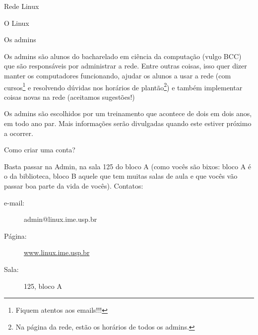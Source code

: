 \begin{subsecao}{Rede Linux}
\begin{subsubsecao}{O Linux}
\end{subsubsecao}

\begin{subsubsecao}{Os admins}

Os admins são alunos do bacharelado em ciência da computação (vulgo BCC) que
são responsáveis por administrar a rede. Entre outras coisas, isso quer dizer
manter os computadores funcionando, ajudar os alunos a usar a rede (com
cursos\footnote{ Fiquem atentos aos emails!!!} e resolvendo dúvidas nos
horários de plantão\footnote{ Na página da rede, estão os horários de todos os
admins.}) e também implementar coisas novas na rede (aceitamos sugestões!)

Os admins são escolhidos por um treinamento que acontece de dois em dois anos,
em todo ano par. Mais informações serão divulgadas quando este estiver próximo
a ocorrer.

\end{subsubsecao}
\begin{subsubsecao}{Como criar uma conta?}

Basta passar na Admin, na sala 125 do bloco A (como vocês são bixos: bloco A é o da
biblioteca, bloco B aquele que tem muitas salas de aula e que vocês vão passar boa
parte da vida de vocês). Contatos:

\vspace{-1em}

\begin{description}
\item [e-mail:] admin@linux.ime.usp.br
\item [Página:] \url{www.linux.ime.usp.br}
\item [Sala:] 125, bloco A
\end{description}

\vspace{-.5em}

\end{subsubsecao}

\end{subsecao}

